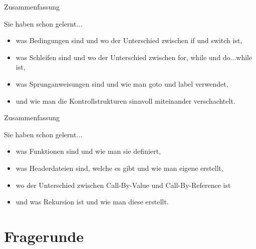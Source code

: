 \documentclass[usenames,dvipsnames,10pt]{beamer}
\begin{document}
    \begin{frame}{Zusammenfassung}
        \begin{block}{Sie haben schon gelernt...}
            \begin{itemize}
                \item was Bedingungen sind und wo der Unterschied zwischen if und switch ist,
                \item was Schleifen sind und wo der Unterschied zwischen for, while und do...while ist,
                \item was Sprunganweisungen sind und wie man goto und label verwendet,
                \item und wie man die Kontrollstrukturen sinnvoll miteinander verschachtelt.
            \end{itemize}
        \end{block}
    \end{frame}
    \begin{frame}{Zusammenfassung}
        \begin{block}{Sie haben schon gelernt...}
            \begin{itemize}
                \item was Funktionen sind und wie man sie definiert,
                \item was Headerdateien sind, welche es gibt und wie man eigene erstellt,
                \item wo der Unterschied zwischen Call-By-Value und Call-By-Reference ist
                \item und was Rekursion ist und wie man diese erstellt.
            \end{itemize}
        \end{block}
    \end{frame}
    \section{Fragerunde}
\end{document}
